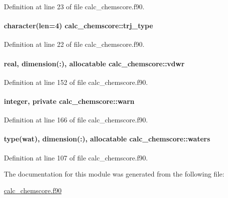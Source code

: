 Definition at line 23 of file calc\-\_\-chemscore.\-f90.

\hypertarget{classcalc__chemscore_a47f6a15d75ed5c28132a8cc8c8141416}{
\paragraph[{trj\-\_\-type}]{\setlength{\rightskip}{0pt plus 5cm}character(len=4) calc\-\_\-chemscore\-::trj\-\_\-type}}\label{classcalc__chemscore_a47f6a15d75ed5c28132a8cc8c8141416}


Definition at line 22 of file calc\-\_\-chemscore.\-f90.

\hypertarget{classcalc__chemscore_a0a9f262f34f33777a05e38e993df8a66}{
\paragraph[{vdwr}]{\setlength{\rightskip}{0pt plus 5cm}real, dimension(\-:), allocatable calc\-\_\-chemscore\-::vdwr}}\label{classcalc__chemscore_a0a9f262f34f33777a05e38e993df8a66}


Definition at line 152 of file calc\-\_\-chemscore.\-f90.

\hypertarget{classcalc__chemscore_af393275025caa6267b2c9ee46fadd3d7}{
\paragraph[{warn}]{\setlength{\rightskip}{0pt plus 5cm}integer, private calc\-\_\-chemscore\-::warn\hspace{0.3cm}{\ttfamily [private]}}}\label{classcalc__chemscore_af393275025caa6267b2c9ee46fadd3d7}


Definition at line 166 of file calc\-\_\-chemscore.\-f90.

\hypertarget{classcalc__chemscore_ab81e8c2249c6c29046df0cf2d5dc9cac}{
\paragraph[{waters}]{\setlength{\rightskip}{0pt plus 5cm}type({\bf wat}), dimension(\-:), allocatable calc\-\_\-chemscore\-::waters}}\label{classcalc__chemscore_ab81e8c2249c6c29046df0cf2d5dc9cac}


Definition at line 107 of file calc\-\_\-chemscore.\-f90.



The documentation for this module was generated from the following file\-:\begin{DoxyCompactItemize}
\item 
\hyperlink{calc__chemscore_8f90}{calc\-\_\-chemscore.\-f90}\end{DoxyCompactItemize}
